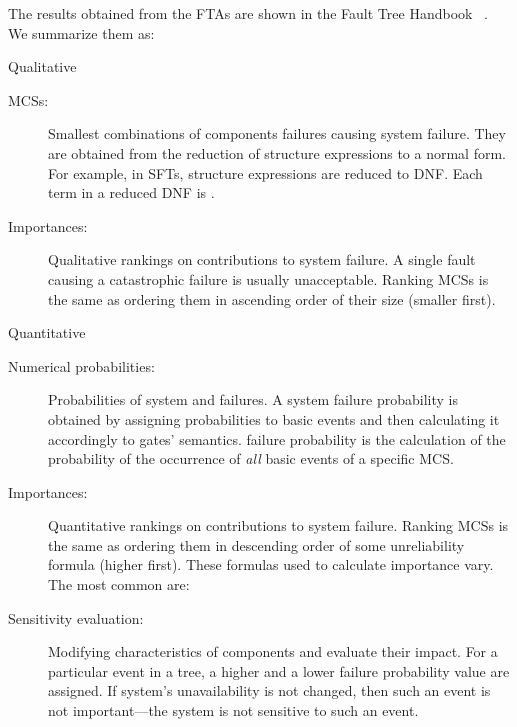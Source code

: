 \documentclass[12pt,openright,twoside,a4paper,oldfontcommands,english,brazil,draft]{abntex2}
\theoremstyle{theo}
\def\FThandbook{Fault Tree Handbook~\cite{VGR+1981}\index{Fault Tree!Handbook}%
  \gdef\FThandbook{Fault Tree Handbook\index{Fault Tree!Handbook}\xspace}%
  \xspace}
\begin{document}
\begin{sloppypar}
The results obtained from the \acp{FTA} are shown in the \FThandbook.
We summarize them as:
%
\begin{alineas}
  \item Qualitative
  \begin{description}
    \item[\Acp{MCS}:]
    Smallest combinations of components failures causing system failure.
    They are obtained from the reduction of structure expressions to a normal form.
    For example, in \acp{SFT}, structure expressions are reduced to \ac{DNF}.
    Each term in a reduced \ac{DNF} is .
    \item[Importances:]
    Qualitative rankings on contributions to system failure.
    A single fault causing a catastrophic failure is usually unacceptable.
    Ranking \acp{MCS} is the same as ordering them in ascending order of their size (smaller first).
  \end{description}
  \item Quantitative
  \begin{description}
    \item[Numerical probabilities:]
    Probabilities of system and  failures.
    A system failure probability is obtained by assigning probabilities to basic events and then calculating it accordingly to gates' semantics.
     failure probability is the calculation of the probability of the occurrence of \emph{all} basic events of a specific \ac{MCS}.
    \item[Importances:]
    Quantitative rankings on contributions to system failure.
    Ranking \acp{MCS} is the same as ordering them in descending order of some unreliability formula (higher first).
    These formulas used to calculate importance vary.
    The most common are:
    \item[Sensitivity evaluation:]
    Modifying characteristics of components and evaluate their impact.
    For a particular event in a tree, a higher and a lower failure probability value are assigned.
    If system's unavailability is not changed, then such an event is not important---the system is not sensitive to such an event.
  \end{description}\end{alineas}
\end{sloppypar}
\end{document}
